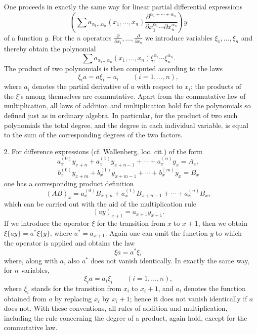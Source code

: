 \documentclass[11pt]{article}
\providecommand{\p}{\partial}
\providecommand{\p}{\partial}
\begin{document}
One proceeds in exactly the same way for linear partial differential expressions
\[
 \left(\sum a_{\alpha_1\ldots\alpha_n}(x_1,\ldots,x_n)
 \frac{\p^{\alpha_1+\cdots+\alpha_n}}
 {\p x_1^{\alpha_1}\cdots\p x_n^{\alpha_n}}\right)y
\]
of a function $y$. For the $n$ operators $\frac{\p}{\p x_1},\ldots,\frac{\p}{\p x_n}$ we introduce variables $\xi_1,
\ldots,\xi_n$ and thereby obtain the polynomial
\[
 \sum a_{\alpha_1\ldots\alpha_n}(x_1,\ldots,x_n)
 \xi_1^{\alpha_1}\cdots\xi_n^{\alpha_n}.
\]
The product of two polynomials is then computed according to the laws
\begin{equation}
 \xi_i a=a\xi_i+a_i \qquad (i=1,\ldots,n),
\tag{2}
\end{equation}
where $a_i$ denotes the partial derivative of $a$ with respect to $x_i$; the products of the $\xi$'s among themselves are commutative. Apart from the commutative law of multiplication, all laws of addition and multiplication hold for the polynomials so defined just as in ordinary algebra. In particular, for the product of two such polynomials the total degree, and the degree in each individual variable, is equal to the sum of the corresponding degrees of the two factors.

2. For difference expressions (cf. Wallenberg, loc. cit.) of the form
\[
 a_x^{(0)}y_{x+n}+a_x^{(1)}y_{x+n-1}+\cdots+a_x^{(n)}y_x=A_x,
\]
\[
 b_x^{(0)}y_{x+m}+b_x^{(1)}y_{x+m-1}+\cdots+b_x^{(m)}y_x=B_x
\]
one has a corresponding product definition
\[
 (AB)_x=a_x^{(0)}B_{x+n}+a_x^{(1)}B_{x+n-1}+\cdots+a_x^{(n)}B_x,
\]
which can be carried out with the aid of the multiplication rule
\[
 (ay)_{x+1}=a_{x+1}y_{x+1}.
\]
If we introduce the operator $\xi$ for the transition from $x$ to $x+1$, then we obtain $\xi\{ay\}=a^*\xi\{y\}$, where $a^*=a_{x+1}$. Again one can omit the function $y$ to which the operator is applied and obtains the law
\begin{equation}
 \xi a=a^*\xi,
\tag{3}
\end{equation}
where, along with $a$, also $a^*$ does not vanish identically. In exactly the same way, for $n$ variables,
\begin{equation}
 \xi_i a=a_i\xi_i\qquad (i=1,\ldots,n),
\tag{4}
\end{equation}
where $\xi_i$ stands for the transition from $x_i$ to $x_i+1$, and $a_i$ denotes the function obtained from $a$ by replacing $x_i$ by $x_i+1$; hence it does not vanish identically if $a$ does not. With these conventions, all rules of addition and multiplication, including the rule concerning the degree of a product, again hold, except for the commutative law.
\end{document}
